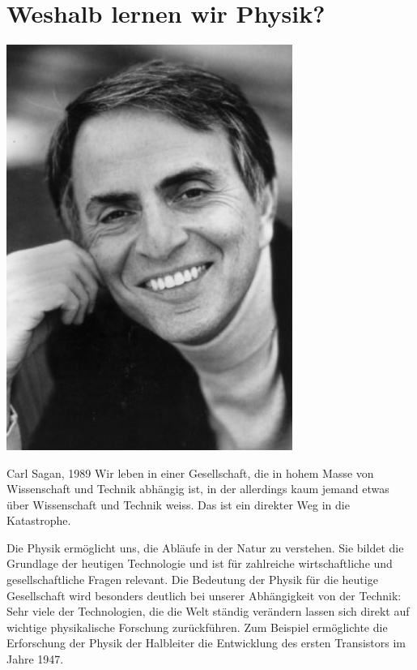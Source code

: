 \section{Weshalb lernen wir Physik?}
\begin{marginfigure}
    \includegraphics[width=0.7\textwidth]{Bilder/sagan.jpg}
	\label{fig:sagan}
\end{marginfigure} 
\begin{aquote}{Carl Sagan, 1989}
	Wir leben in einer Gesellschaft, die in hohem Masse von Wissenschaft und Technik abhängig ist, in der allerdings kaum jemand etwas über Wissenschaft und Technik weiss. Das ist ein direkter Weg in die Katastrophe.
\end{aquote}
Die Physik ermöglicht uns, die Abläufe in der Natur zu verstehen. Sie bildet die Grundlage der heutigen Technologie und ist für zahlreiche wirtschaftliche und gesellschaftliche Fragen relevant. Die Bedeutung der Physik für die heutige Gesellschaft wird besonders deutlich bei unserer Abhängigkeit von der Technik: Sehr viele der Technologien, die die Welt ständig verändern lassen sich direkt auf wichtige physikalische Forschung zurückführen. Zum Beispiel ermöglichte die Erforschung der Physik der Halbleiter die Entwicklung des ersten Transistors im Jahre 1947.
